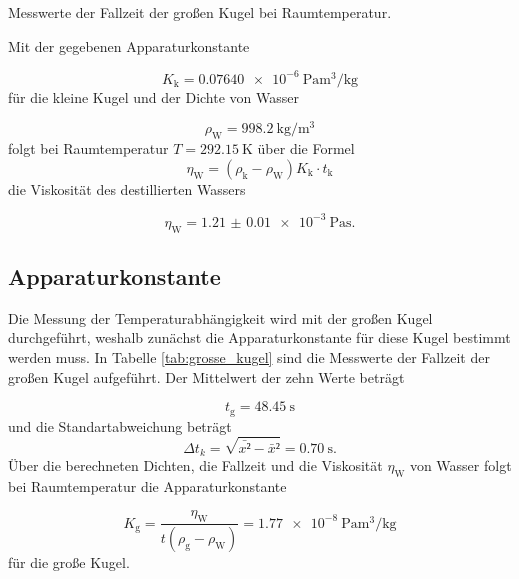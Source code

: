 \begin{table}
  \centering
  
  \caption{Messwerte der Fallzeit der großen Kugel bei Raumtemperatur.}
  \label{tab:grosse_kugel}
\end{table}

\noindent Mit der gegebenen Apparaturkonstante

\begin{equation*}
  K_\text{k} = \SI{0.07640e-6}{\pascal\cubic\meter\per\kilo\gram}
\end{equation*}
für die kleine Kugel und der Dichte von Wasser \cite{TfCuP}

\begin{equation*}
  \rho_\text{W} = \SI{998.2}{\kilo\gram\per\cubic\meter}
\end{equation*}
folgt bei Raumtemperatur $T=\SI{292,15}{\kelvin}$ über die Formel
\begin{equation*}
  \eta_\text{W} = (\rho_\text{k}-\rho_\text{W})K_\text{k} \cdot t_\text{k}
\end{equation*}
die Viskosität des destillierten Wassers

\begin{equation*}
  \eta_\text{W} = \SI{1.21(1)e-3}{\pascal\second}.
\end{equation*}


\subsection{Apparaturkonstante}

Die Messung der Temperaturabhängigkeit wird mit der großen Kugel durchgeführt,
weshalb zunächst die Apparaturkonstante für diese Kugel bestimmt werden muss. In Tabelle \ref{tab:grosse_kugel} sind die Messwerte der Fallzeit der großen
Kugel aufgeführt. Der Mittelwert der zehn Werte beträgt

\begin{equation*}
  t_\text{g} = \SI{48.45}{\second}
\end{equation*}
und die Standartabweichung beträgt
\begin{equation*}
  \Delta t_{k} = \sqrt{\bar{x²}-\bar{x}²} = \SI{0.70}{\second}.
\end{equation*}
Über die berechneten Dichten, die Fallzeit und die Viskosität $\eta_\text{W}$
von Wasser folgt bei Raumtemperatur die Apparaturkonstante

\begin{equation*}
  K_\text{g} = \frac{\eta_\text{W}}{t(\rho_\text{g}-\rho_\text{W})}
  = \SI{1.77e-8}{\pascal\cubic\meter\per\kilo\gram}
\end{equation*}
für die große Kugel.


